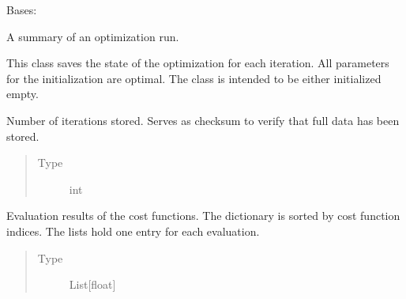 \documentclass[letterpaper,10pt,english]{sphinxmanual}
\begin{document}
\begin{fulllineitems}
\label{\detokenize{qsim:qsim.optimization_data.OptimizationSummary}}
Bases: 

A summary of an optimization run.

This class saves the state of the optimization for each iteration. All
parameters for the initialization are optimal. The class is intended to be
either initialized empty.

\begin{fulllineitems}
\label{\detokenize{qsim:qsim.optimization_data.OptimizationSummary.iter_num}}
Number of iterations stored. Serves as checksum to verify that full
data has been stored.
\begin{quote}\begin{description}
\item[{Type}] \leavevmode
int

\end{description}\end{quote}

\end{fulllineitems}


\begin{fulllineitems}
\label{\detokenize{qsim:qsim.optimization_data.OptimizationSummary.costs}}
Evaluation results of the cost functions. The dictionary is sorted by
cost function indices. The lists hold one entry for each evaluation.
\begin{quote}\begin{description}
\item[{Type}] \leavevmode
List{[}float{]}

\end{description}\end{quote}


\end{fulllineitems}
\end{fulllineitems}
\end{document}
